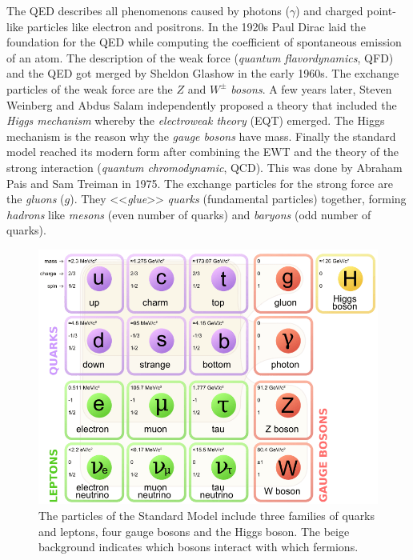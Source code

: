 \documentclass[a4paper,11pt,twosided,final,german,openbib,pdftex,listof=totoc,bibliography=totoc]{scrbook}
\begin{document}
The QED describes all phenomenons caused by photons ($\gamma$) and charged point-like particles like electron and positrons. In the 1920s Paul Dirac laid the foundation for the QED while computing the coefficient of spontaneous emission of an atom. The description of the weak force (\textit{quantum flavordynamics}, QFD) and the QED got merged by Sheldon Glashow in the early 1960s. The exchange particles of the weak force are the $Z$ and $W^{\pm}$ \textit{bosons}. A few years later, Steven Weinberg and Abdus Salam independently proposed a theory that included the \textit{Higgs mechanism} whereby the \textit{electroweak theory} (EQT) emerged. The Higgs mechanism is the reason why the \textit{gauge bosons} have mass.
Finally the standard model reached its modern form after combining the EWT and the theory of the strong interaction (\textit{quantum chromodynamic}, QCD). This was done by Abraham Pais and Sam Treiman in 1975. The exchange particles for the strong force are the \textit{gluons} ($g$). They <<\textit{glue}>> \textit{quarks} (fundamental particles) together, forming \textit{hadrons} like \textit{mesons} (even number of quarks) and \textit{baryons} (odd number of quarks). \cite{RiseStandard} \\ 

\begin{figure}[h!]
	\centering
	\includegraphics[width=15cm]{Bilder/SM.png}
	\caption[Standard Model]{The particles of the Standard Model include three families of quarks and leptons, four gauge bosons and the Higgs boson. The beige background indicates which bosons interact with which fermions. \cite{SMFigure}}
	\label{fig:SM}
\end{figure}
\end{document}
